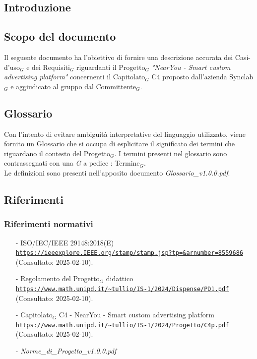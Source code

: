 \documentclass[10pt]{article}
\begin{document}
\newpage
\begin{justify}

\section{Introduzione}
\label{sec:intro}

\subsection{Scopo del documento}

Il seguente documento ha l'obiettivo di fornire una descrizione accurata dei Casi-d'uso$_G$ e dei Requisiti$_G$ riguardanti il Progetto$_G$ \textit{"NearYou - 
Smart custom advertising platform"} concernenti il Capitolato$_G$ C4 proposto dall'azienda Synclab$_G$ e aggiudicato al gruppo dal Committente$_G$.


\subsection{Glossario}
Con l'intento di evitare ambiguità interpretative del linguaggio utilizzato, viene fornito un Glossario che si occupa di esplicitare il significato dei termini che riguardano il contesto del Progetto$_G$. I termini presenti nel glossario sono contrassegnati con una \textit{G} a pedice : Termine$_G$.\\
Le definizioni sono presenti nell'apposito documento \textit{Glossario\_v1.0.0.pdf}.


\subsection{Riferimenti}

\subsubsection{Riferimenti normativi}
\begin{itemize}
    \item[-] ISO/IEC/IEEE 29148:2018(E) \\
    \textcolor{blue}{\texttt{\url{https://ieeexplore.IEEE.org/stamp/stamp.jsp?tp=&arnumber=8559686}}}\\ (Consultato: 2025-02-10).   
    \item[-] Regolamento del Progetto$_G$ didattico  \\
    \textcolor{blue}{\texttt{\url{https://www.math.unipd.it/~tullio/IS-1/2024/Dispense/PD1.pdf}}}\\ (Consultato: 2025-02-10).
    \item[-] Capitolato$_G$ C4 - NearYou - Smart custom advertising platform\\
    \textcolor{blue}{\texttt{\url{https://www.math.unipd.it/~tullio/IS-1/2024/Progetto/C4p.pdf}}}\\ (Consultato: 2025-02-10).
    \item[-] \textit{Norme\_di\_Progetto\_v1.0.0.pdf}
    

\end{itemize}
\end{justify}
\end{document}
